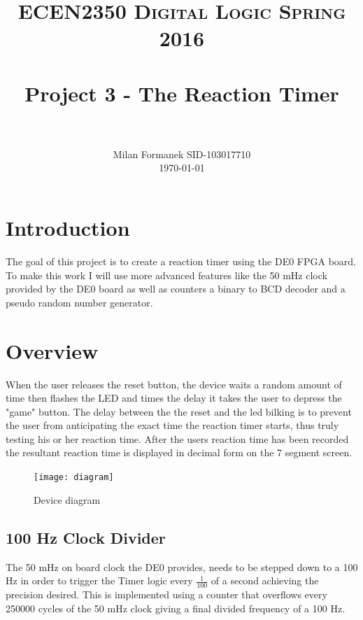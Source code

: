 \documentclass[paper=a4, fontsize=11pt]{scrartcl}
\title{
		\usefont{OT1}{bch}{b}{n}
		\normalfont \normalsize \textsc{ECEN2350 Digital Logic Spring 2016} \\ [25pt]
		\horrule{0.5pt} \\[0.4cm]
		\huge Project 3 - The Reaction Timer \\
		\horrule{2pt} \\[0.5cm]
}
\author{
		\normalfont 								\normalsize
        Milan Formanek SID-103017710\\[-3pt]		\normalsize
        \today
}
\date{}
\numberwithin{equation}{section}		%
\numberwithin{figure}{section}			%
\numberwithin{table}{section}				%
\begin{document}
\begin{center}
{\selectfont}
\maketitle
\clearpage 
\section{Introduction}

The goal of this project is to create a reaction timer using the DE0 FPGA board. To make this work I will use more advanced features like the 50 mHz clock provided by the DE0 board as well as counters a binary to BCD decoder and a pseudo random number generator.

\section{Overview}

When the user releases the reset button, the device waits a random amount of time then flashes the LED and times the delay it takes the user to depress the "game" button. The delay between the the reset and the led bilking is to prevent the user from anticipating the exact time the reaction timer starts, thus truly testing his or her reaction time. After the users reaction time has been recorded the resultant reaction time is displayed in decimal form on the 7 segment screen.


\begin{figure}[h!]
\centering
\caption{Device diagram}
\texttt{[image: diagram]}
\label{fig:dia}
\end{figure}

\subsection{100 Hz Clock Divider}

The 50 mHz on board clock the DE0 provides, needs to be stepped down to a 100 Hz in order to trigger the Timer logic every $\frac{1}{100}$ of a second achieving the precision desired. This is implemented using a counter that overflows every 250000 cycles of the 50 mHz clock giving a final divided frequency of a 100 Hz.


\end{center}
\end{document}
